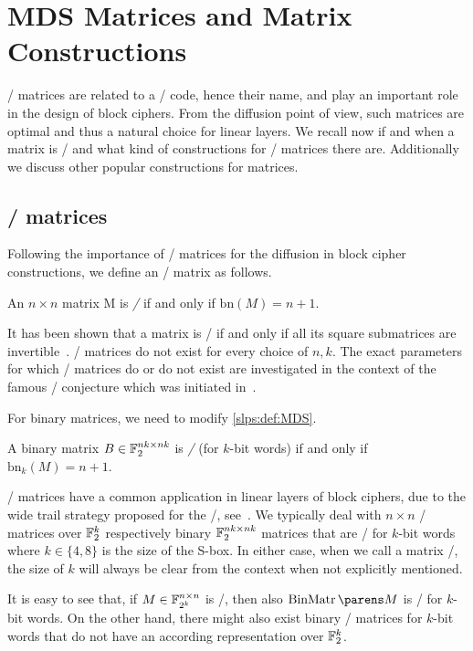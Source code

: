 \section{MDS Matrices and Matrix Constructions}
\label{slps:sec:prelims}

\MDS/ matrices are related to a \MDSl/ code, hence their name, and  play an important role in the design of block ciphers.
From the diffusion point of view, such matrices are optimal and thus a natural choice for linear layers.
We recall now if and when a matrix is \MDS/ and what kind of constructions for \MDS/ matrices there are.
Additionally we discuss other popular constructions for matrices.

\subsection{\MDS/ matrices}
\label{slps:subsec:prelim1}

Following the importance of \MDS/ matrices for the diffusion in block cipher constructions, we define an \MDS/ matrix as follows.
\begin{definition}
\label{slps:def:MDS}
    An $n \times n$ matrix M is \emph{\MDSf/} if and only if $\mathrm{bn}(M) = n+1$.
\end{definition}
It has been shown that a matrix is \MDS/ if and only if all its square submatrices are invertible~\cite[page 321, Theorem 8]{error_correcting_codes}.
\MDS/ matrices do not exist for every choice of $n,k$.
The exact parameters for which \MDS/ matrices do or do not exist are investigated in the context of the famous \MDS/ conjecture which was initiated in~\cite{Segre1955}.

For binary matrices, we need to modify \cref{slps:def:MDS}.
\begin{definition}
    A binary matrix $B \in \mathbb{F}_2^{nk \times nk}$ is \emph{\MDS/} (for $k$-bit words) if and only if $\mathrm{bn}_k(M) = n+1$.
\end{definition}
\MDS/ matrices have a common application in linear layers of block ciphers, due to the wide trail strategy proposed for the \AES/, see~\cite{PhD:Daemen95,rijndael_book}.
We typically deal with $n \times n$ \MDS/ matrices over $\mathbb{F}_2^k$ respectively binary $\mathbb{F}_2^{nk \times nk}$ matrices that are \MDS/ for $k$-bit words where $k \in \{4,8\}$ is the size of the S-box.
In either case, when we call a matrix \MDS/, the size of $k$ will always be clear from the context when not explicitly mentioned.

It is easy to see that, if $M \in \mathbb{F}_{2^k}^{n \times n}$ is \MDS/, then also $\binarymatrix{M}$ is \MDS/ for $k$-bit words.
On the other hand, there might also exist binary \MDS/ matrices for $k$-bit words that do not have an according representation over $\mathbb{F}_2^k$.

